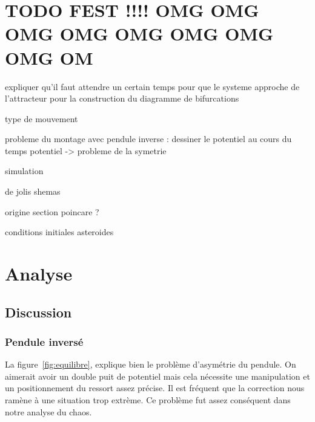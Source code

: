 \documentclass[a4paper,12pt,oneside]{article}
\begin{document}











\clearpage
\section{TODO FEST !!!! OMG OMG OMG OMG OMG OMG OMG OMG OM}


expliquer qu'il faut attendre un certain temps pour que le systeme approche de l'attracteur pour la construction du diagramme de bifurcations

type de mouvement

probleme du montage avec pendule inverse :
dessiner le potentiel au cours du temps
potentiel -> probleme de la symetrie

simulation

de jolis shemas

origine section poincare ?

conditions initiales
asteroides













\clearpage
\section{Analyse}%

\subsection{Discussion}

\subsubsection{Pendule inversé}
La figure~\ref{fig:equilibre}, explique bien le problème d'asymétrie du pendule. On aimerait avoir un double puit de potentiel mais cela nécessite une manipulation et un positionnement du ressort assez précise. Il est fréquent que la correction nous ramène à une situation trop extrème. Ce problème fut assez conséquent dans notre analyse du chaos.
\end{document}
